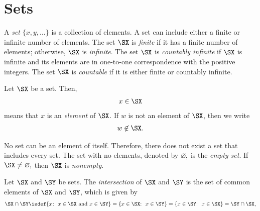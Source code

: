 \section{Sets}

A {\it set} $\{x,y,\ldots\}$ is a collection of elements.
A set can include either a finite or infinite number of elements.
The set $\SX$ is {\it finite} if it has a finite number of elements; otherwise, $\SX$ is {\it infinite}.
%
The set $\SX$ is {\it countably infinite} if $\SX$ is infinite and its elements are in one-to-one correspondence with the positive integers. The set $\SX$ is {\it countable} if it is either finite or countably infinite.

Let $\SX$ be a set.
Then, \begin{align}x\in \SX\end{align} means that $x$ is an {\it element}
\label{insym}%
%
of $\SX$. If $w$ is not an element of $\SX$, then we write
\begin{align}w\not\in \SX.\end{align}
\label{notinsym}

No set can be an element of itself.  Therefore, there does not exist a set that includes every set.  The set with no elements, denoted by $\varnothing\mspace{-1mu},$ is the {\it empty set}.
%
\label{varnothingsym}%
%
%
If $\SX\not=\varnothing\mspace{-1mu},$ then $\SX$ is {\it nonempty}.



Let $\SX$ and $\SY$ be sets. The {\it intersection}
%
of $\SX$ and $\SY$ is the set of common elements of $\SX$ and
$\SY$, which is given by
\begin{align}
\SX\cap \SY
%
\isdef\{x\mspace{-1mu}\colon\ x\in \SX \mbox{ and } x\in \SY \}
%
=  \{ x\in \SX \mspace{-2mu}\colon\ x\in \SY \}
%
=\{x\in \SY\mspace{-2mu}\colon\ x\in \SX \}
%
= \SY \cap \SX,\end{align}
